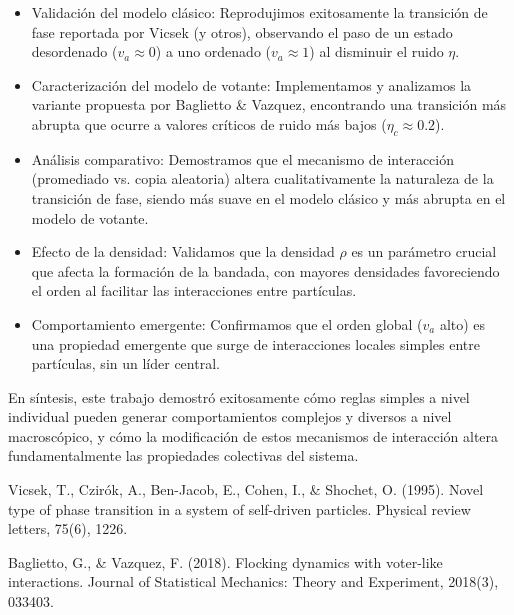 \documentclass{article}
\begin{document}
\begin{itemize}
    \item  Validación del modelo clásico: Reprodujimos exitosamente la transición de fase reportada por Vicsek (y otros), observando el paso de un estado desordenado ($v_a \approx 0$) a uno ordenado ($v_a \approx 1$) al disminuir el ruido $\eta$.

    \item Caracterización del modelo de votante: Implementamos y analizamos la variante propuesta por Baglietto \& Vazquez, encontrando una transición más abrupta que ocurre a valores críticos de ruido más bajos ($\eta_c \approx 0.2$).

    \item  Análisis comparativo: Demostramos que el mecanismo de interacción (promediado vs. copia aleatoria) altera cualitativamente la naturaleza de la transición de fase, siendo más suave en el modelo clásico y más abrupta en el modelo de votante.

    \item  Efecto de la densidad: Validamos que la densidad $\rho$ es un parámetro crucial que afecta la formación de la bandada, con mayores densidades favoreciendo el orden al facilitar las interacciones entre partículas.

    \item  Comportamiento emergente: Confirmamos que el orden global ($v_a$ alto) es una propiedad emergente que surge de interacciones locales simples entre partículas, sin un líder central.
\end{itemize}

En síntesis, este trabajo demostró exitosamente cómo reglas simples a nivel individual pueden generar comportamientos complejos y diversos a nivel macroscópico, y cómo la modificación de estos mecanismos de interacción altera fundamentalmente las propiedades colectivas del sistema.


\begin{thebibliography}{9}
Vicsek, T., Czirók, A., Ben-Jacob, E., Cohen, I., \& Shochet, O. (1995). Novel type of phase transition in a system of self-driven particles. Physical review letters, 75(6), 1226.

Baglietto, G., \& Vazquez, F. (2018). Flocking dynamics with voter-like interactions. Journal of Statistical Mechanics: Theory and Experiment, 2018(3), 033403.
\end{thebibliography}
\end{document}
